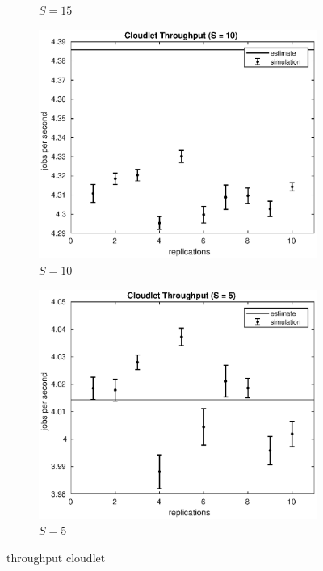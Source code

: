 \begin{figure}[!h]
\begin{subfigure}[t]{0.49\textwidth}
\caption{$S = 15$}
\label{15_xclet}
\end{subfigure}
%
\begin{subfigure}[t]{0.49\textwidth}
\includegraphics[width=\textwidth]{figures/simul/10_500K_xclet}
\caption{$S = 10$}
\label{10_xclet}
\end{subfigure}
%
\begin{subfigure}[t]{0.49\textwidth}
\includegraphics[width=\textwidth]{figures/simul/5_500K_xclet}
\caption{$S = 5$}
\label{5_xclet}
\end{subfigure}
%
\caption{throughput cloudlet}
\label{plot:xclet}
\end{figure}
%
%

